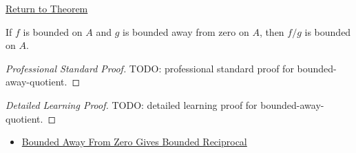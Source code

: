 \newpage
{}
\label{prf:bounded-away-quotient}

\begin{remark*}[Return]
\hyperref[thm:bounded-away-quotient]{Return to Theorem}
\end{remark*}

\begin{theorem*}
If \(f\) is bounded on \(A\) and \(g\) is bounded away from zero on \(A\),
then \(f/g\) is bounded on \(A\).
\end{theorem*}

\begin{proof}[Professional Standard Proof]
\LRAProofBodyStart
TODO: professional standard proof for bounded-away-quotient.
\end{proof}

\begin{proof}[Detailed Learning Proof]
\LRAProofBodyStart
TODO: detailed learning proof for bounded-away-quotient.
\end{proof}

\begin{remark*}
\end{remark*}

\begin{dependencies}
\begin{itemize}
  \item \hyperref[thm:bounded-away-from-zero-gives-bounded-reciprocal]{Bounded Away From Zero Gives Bounded Reciprocal}
\end{itemize}
\end{dependencies}

\clearpage
